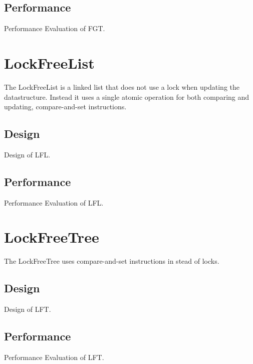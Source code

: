 \documentclass[a4paper]{article}
\begin{document}
\subsection{Performance}

Performance Evaluation of FGT.

\section{LockFreeList}

The LockFreeList is a linked list that does not use a lock when updating
the datastructure. Instead it uses a single atomic operation for both
comparing and updating, compare-and-set instructions.

\subsection{Design}

Design of LFL.

\subsection{Performance}

Performance Evaluation of LFL.

\section{LockFreeTree}

The LockFreeTree uses compare-and-set instructions in stead of locks.

\subsection{Design}

Design of LFT.

\subsection{Performance}

Performance Evaluation of LFT.
\end{document}

